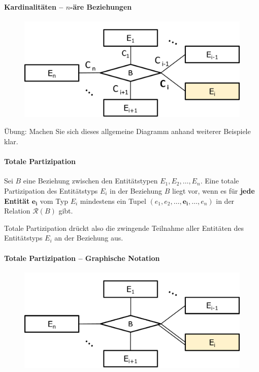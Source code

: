 \begin{frame}{\insertsection}
\framesubtitle{Kardinalitäten -- $n$-\"are Beziehungen}
\begin{figure}
	\includegraphics[scale=0.5]{img/ERM-Kardinalitaet.png}
\end{figure}  
\alert{\"Ubung: Machen Sie sich dieses allgemeine Diagramm anhand weiterer Beispiele klar.}
\end{frame}

\begin{frame}{\insertsection}
\framesubtitle{Totale Partizipation}
\begin{definition} Sei $B$ eine Beziehung zwischen den Entit\"atstypen $E_1, E_2,\ldots, E_n$. 
	Eine totale Partizipation des Entit\"atstyps $E_i$ in der Beziehung $B$ liegt vor, wenn es für \textbf{jede Entit\"at} $\mathbf{e_i}$
	vom Typ $E_i$ mindestens ein Tupel $(e_1,e_2,\ldots,\mathbf{e_i},\ldots,e_n)$ in der Relation $\mathcal{R}(B)$ gibt.
\end{definition} 
\abs
Totale Partizipation dr\"uckt also die zwingende Teilnahme aller Entit\"aten des Entitätstyps $E_i$ an der Beziehung aus. 
\end{frame}

\begin{frame}{\insertsection}
\framesubtitle{Totale Partizipation -- Graphische Notation}
\begin{figure}
\includegraphics[scale=0.6]{img/ERM-TotalePartizipation.png}
\end{figure}  
\end{frame}

